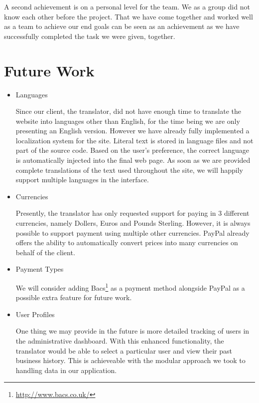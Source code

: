 \documentclass{l3proj}
\begin{document}
A second achievement is on a personal level for the team. We as a group did not know each other before the project.
That we have come together and worked well as a team to achieve our end goals can be seen as an achievement as we have
successfully completed the task we were given, together.

\section{Future Work}
\label{sect:fut-work}
\begin{itemize}
\item{Languages}

Since our client, the translator, did not have enough time to translate the website into languages other 
than English, for the time being we are only presenting an English version. However we have already fully implemented a localization system
for the site. Literal text is stored in language files and not part of the
source code. Based on the user's preference, the correct language is automatically
injected into the final web page. As soon as we are provided complete
translations of the text used throughout the site, we will happily support multiple
languages in the interface.

\item{Currencies}

Presently, the translator has only requested support for paying in 3 different
currencies, namely Dollers, Euros and Pounds Sterling. 
However, it is always possible to support payment using multiple other currencies.
PayPal already offers the ability to automatically convert prices into many
currencies on behalf of the client.

\item{Payment Types}

We will consider adding Bacs\footnote{\url{http://www.bacs.co.uk/}} as a payment method alongside PayPal as a possible extra feature for future work.

\item{User Profiles}

One thing we may provide in the future is more detailed tracking of users in the
administrative dashboard. With this enhanced functionality, the translator would
be able to select a particular user and view their past business history.
This is achieveable with the modular approach we took to handling
data in our application.
 
\end{itemize}
\end{document}
